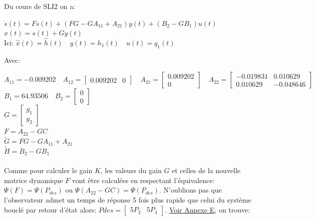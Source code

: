 	 Du cours de SLI2 on a:
	 
	 \begin{center}
	 $\dot s(t)= F s(t) +(FG-GA_{11}+A_{21})y(t)+(B_2-GB_1)u(t)$\\[0.25cm]
	 $\widehat{x}(t)=s(t)+Gy(t)$\\[0.25cm]
	 Ici: $\widehat{x}(t)=\widehat{h}(t) \quad y(t)=h_1(t) \quad u(t)=q_1(t)$
	 \end{center}
	 	
	Avec:

		\begin{center}
			
			$A_{11}= -0.009202 \quad A_{12}=\begin{bmatrix} 0.009202&0 \end{bmatrix} \quad A_{21}=\begin{bmatrix} 0.009202\\0 \end{bmatrix} \quad A_{22}= \begin{bmatrix} -0.019831 & 0.010629\\0.010629 & -0.048646 \end{bmatrix} $\\[0.5cm]
			$B_1=64.93506 \quad B_2=\begin{bmatrix} 0\\0 \end{bmatrix}$\\[0.25cm]
			$G= \begin{bmatrix} g_1\\g_2 \end{bmatrix}$\\[0.25cm]
			$F=A_{22}-GC$\\[0.25cm]
			$\tilde{G}= FG-GA_{11}+A_{21}$\\[0.25cm]
			$\tilde{H}= B_2-GB_1$
			
		\end{center}
		
		\paragraph{} Comme pour calculer le gain $K$, les valeurs du gain $G$ et celles de la nouvelle matrice dynamique $F$ vont être calculées en respectant l'équivalence: $ \Psi(F)= \Psi(P_{des})$ ou $ \Psi(A_{22}-GC)= \Psi(P_{des})$. N'oublions pas que l'observateur admet un temps de réponse 5 fois plus rapide que celui du système bouclé par retour d'état alors: $ P{des} = \begin{bmatrix} 5P_2&5P_3 \end{bmatrix}$. \label{calobs} \hyperref[Annexe E]{Voir Annexe E}, on trouve:
		
